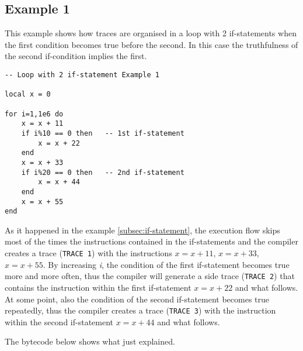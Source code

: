 \subsection{Example 1}
\label{2-if-example1}
This example shows how traces are organised in a loop with 2 if-statements when the first condition becomes true before the second. In this case the truthfulness of the second if-condition implies the first.
\begin{mdframed}[style=LuaStyleFrame]
\begin{lstlisting}[style=LuaStyle]
-- Loop with 2 if-statement Example 1

local x = 0

for i=1,1e6 do
	x = x + 11
    if i%10 == 0 then   -- 1st if-statement
		x = x + 22
	end
	x = x + 33
    if i%20 == 0 then   -- 2nd if-statement
		x = x + 44
	end
	x = x + 55
end
\end{lstlisting}
\end{mdframed}
As it happened in the example \ref{subsec:if-statement}, the execution flow skips most of the times the instructions contained in the if-statements and the compiler creates a trace (\texttt{TRACE 1}) with the instructions $x=x+11$, $x=x+33$, $x=x+55$. By increasing \textit{i}, the condition of the first if-statement becomes true more and more often, thus the compiler will generate a side trace (\texttt{TRACE 2}) that contains the instruction within the first if-statement $x=x+22$ and what follows. At some point, also the condition of the second if-statement becomes true repeatedly, thus the compiler creates a trace (\texttt{TRACE 3}) with the instruction within the second if-statement $x=x+44$ and what follows.
\begin{comment}
The side exit that corresponds to the first if-statement is taken more often than the second. Thus, the first side trace to be generated (TRACE 2) refers to the first if-statement. Then, when the side exit that corresponds to the second side trace is taken enough times, another side trace will be created (TRACE 3). It should be noted that in this case TRACE 3 is a side trace of TRACE 2, while TRACE 2 is a side trace of TRACE 1.
The code above generates the following bytecode dump. TRACE 1 contains all the instructions, but the ones inside the if-statements (lines 7 and 11); TRACE 2 the instructions inside the first if-statement and what follows; TRACE 3 the instructions inside the second if-statement and what follows.
\end{comment}

The bytecode below shows what just explained.

